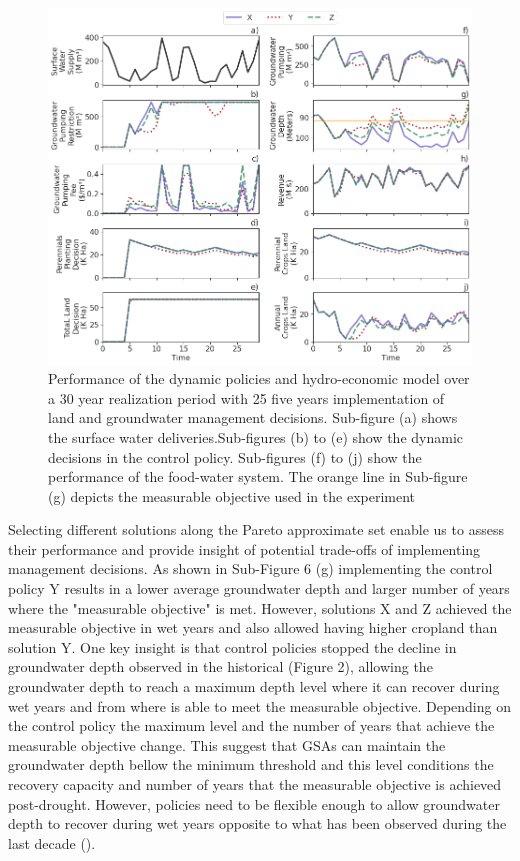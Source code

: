 \documentclass[11pt,a4paper]{article}
\begin{document}
\begin{figure}[H]
    \centering
    \includegraphics[width=1\textwidth]{selected_policies_performance.png}
    \caption{Performance of the dynamic policies and hydro-economic model over a 30 year realization period with 25 five years implementation of land and groundwater management decisions. Sub-figure (a) shows the surface water deliveries.Sub-figures (b) to (e) show the dynamic decisions in the control policy. Sub-figures (f) to (j) show the performance of the food-water system. The orange line in Sub-figure (g) depicts the measurable objective used in the experiment} \label{fig:parallel_robustness}
\end{figure}

Selecting different solutions along the Pareto approximate set enable us to assess their performance and provide insight of potential trade-offs of implementing management decisions. As shown in Sub-Figure 6 (g) implementing the control policy Y results in a lower average groundwater depth and larger number of years where the "measurable objective" is met. However, solutions X and Z achieved the measurable objective in wet years and also allowed having higher cropland than solution Y. 
One key insight is that control policies stopped the decline in groundwater depth observed in the historical (Figure 2), allowing the groundwater depth to reach a maximum depth level where it can recover during wet years and from where is able to meet the measurable objective. Depending on the control policy the maximum level and the number of years that achieve the measurable objective change. This suggest that GSAs can maintain the groundwater depth bellow the minimum threshold and this level conditions the recovery capacity and number of years that the measurable objective is achieved post-drought. However, policies need to be flexible enough to allow groundwater depth to recover during wet years opposite to what has been observed during the last decade (\cite{liu_groundwater_2022,alam_post-drought_2021}).
\end{document}
